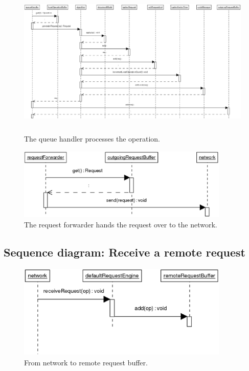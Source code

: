 \begin{figure}[H]
\centering
\includegraphics[height=7.3cm,width=13.86cm]{../../images/algo-impl/queue_handler.eps}
\caption{The queue handler processes the operation.}
\label{The queue handler processes the operation.}
\end{figure}

\begin{figure}[H]
\centering
\includegraphics[height=3.42cm,width=10.09cm]{../../images/algo-impl/requestForwarder.eps}
\caption{The request forwarder hands the request over to the network.}
\label{The request forwarder hands the request over to the network.}
\end{figure}

\subsection{Sequence diagram: Receive a remote request}
\begin{figure}[H]
\centering
\includegraphics[height=4.48cm,width=10.09cm]{../../images/algo-impl/client_receive_request.eps}
\caption{From network to remote request buffer.}
\label{From network to remote request buffer.}
\end{figure}

